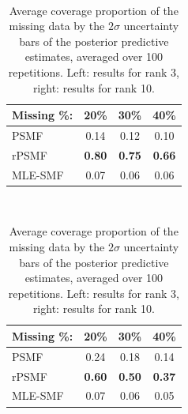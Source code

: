 \documentclass{mldsmsc}
\begin{document}
\begin{table}[H]
    \centering
    \begin{minipage}{0.45\textwidth}
        \centering
         \\[0.5ex]
        \begin{threeparttable}
            \begin{tabular}{lccc}
                \hline
                Missing \%: & 20\% & 30\% & 40\% \\
                \hline
                PSMF & 0.14 & 0.12 & 0.10 \\
                rPSMF & \textbf{0.80} & \textbf{0.75} & \textbf{0.66} \\
                MLE-SMF & 0.07 & 0.06 & 0.06 \\
                \hline
            \end{tabular}
        \end{threeparttable}
    \end{minipage}%
    \hspace{0.1\textwidth}%
    \begin{minipage}{0.45\textwidth}
        \centering
         \\[0.5ex]
        \begin{threeparttable}
            \begin{tabular}{lccc}
                \hline
                Missing \%: & 20\% & 30\% & 40\% \\
                \hline
                PSMF & 0.24 & 0.18 & 0.14 \\
                rPSMF & \textbf{0.60} & \textbf{0.50} & \textbf{0.37} \\
                MLE-SMF & 0.07 & 0.06 & 0.05 \\
                \hline
            \end{tabular}
        \end{threeparttable}
    \end{minipage}
    \caption{Average coverage proportion of the missing data by the $2\sigma$ uncertainty bars of the posterior predictive estimates, averaged over 100 repetitions. Left: results for rank 3, right: results for rank 10.}
\end{table}

\end{document}

